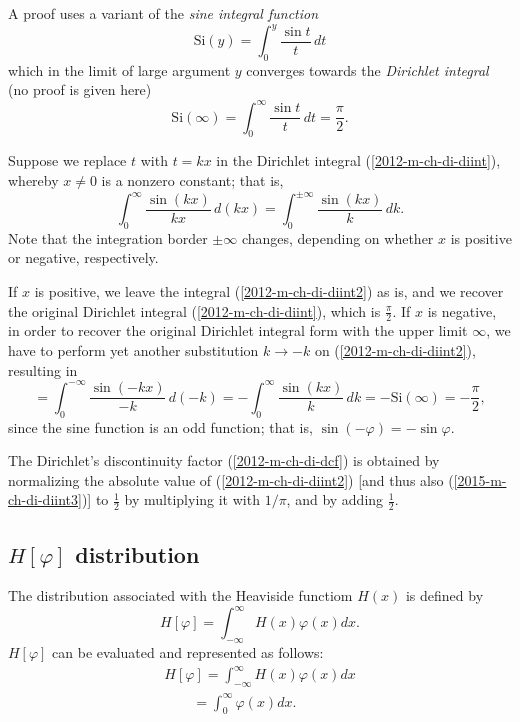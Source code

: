{\color{OliveGreen}
\bproof
A proof \cite{maor1998} uses a variant
of the {\em sine integral function}
\begin{equation}
\textrm{Si}(y) = \int_0^y \frac{\sin t}{t} \,dt
\end{equation}
which in the limit of large argument $y$ converges towards
the {\em Dirichlet integral}   (no proof is given here)
\begin{equation}
\textrm{Si}(\infty ) = \int_0^\infty  \frac{\sin t}{t} \,dt= \frac{\pi}{2}.
\label{2012-m-ch-di-diint}
\end{equation}


Suppose we
replace $t$ with $t=kx$
in the Dirichlet integral (\ref{2012-m-ch-di-diint}),
whereby $x\neq 0$ is a nonzero constant; that is,
\begin{equation}
\int_0^\infty  \frac{\sin (kx)}{kx} \,d(kx)
= \int_0^{\pm \infty}  \frac{\sin (kx)}{k} \,dk
.
\label{2012-m-ch-di-diint2}
\end{equation}
Note that the integration border $\pm \infty$ changes, depending on whether $x$ is positive or negative,
respectively.

If $x$ is positive, we leave the integral
(\ref{2012-m-ch-di-diint2})
as is, and we recover the original Dirichlet integral (\ref{2012-m-ch-di-diint}),
which is $\frac{\pi}{2}$.
If $x$ is negative,
in order to recover the original Dirichlet integral form with the upper limit $\infty$,
we have to perform yet another substitution $k \rightarrow -k$
on (\ref{2012-m-ch-di-diint2}), resulting in
\begin{equation}
= \int_0^{-\infty}  \frac{\sin (-kx)}{-k} \,d(-k)
= -\int_0^{\infty}  \frac{\sin (kx)}{k} \,dk
= - \textrm{Si}(\infty ) =  -\frac{\pi}{2}
,
\label{2015-m-ch-di-diint3}
\end{equation}
since the sine function is an odd function; that is, $\sin(-\varphi )=-\sin \varphi $.


The Dirichlet's discontinuity factor (\ref{2012-m-ch-di-dcf})
is obtained by normalizing the absolute value of
(\ref{2012-m-ch-di-diint2}) [and thus also
(\ref{2015-m-ch-di-diint3})]
to $\frac{1}{2}$
by multiplying  it with $1/\pi$, and by adding $\frac{1}{2}$.
\eproof
}

\subsection{$H  \left[ \varphi \right]$ distribution}
The distribution associated with the Heaviside functiom $H(x)$ is defined by
\begin{equation}
H \left[ \varphi \right] =
\int_{-\infty}^\infty  H(x)  \varphi(x) dx.
 \end{equation}
$H  \left[ \varphi \right]$
can be evaluated and represented as follows:
\begin{equation}
\begin{split}
H  \left[ \varphi \right]
=
\int_{-\infty}^\infty  H(x) \varphi(x) dx
\\
\qquad
=
\int_{0}^\infty      \varphi(x) dx
.
\end{split}
\end{equation}

